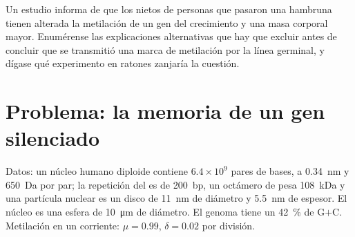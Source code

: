 \begin{exercise}[$\star\star\star$]\label{exo:b3:chromatin-epigenetics:12}
Un estudio informa de que los nietos de personas que pasaron una hambruna
tienen alterada la metilación de un gen del crecimiento y una masa
corporal mayor. Enumérense las explicaciones alternativas que hay que
excluir antes de concluir que se transmitió una marca de metilación por
la línea germinal, y dígase qué experimento en ratones zanjaría la
cuestión.
\end{exercise}

\section{Problema: la memoria de un gen silenciado}

\begin{problem}
\label{pb:b3:chromatin-epigenetics:1}
Datos: un núcleo humano diploide contiene $6.4\times 10^{9}$ pares de
bases, a \qty{0.34}{nm} y \qty{650}{Da} por par; la repetición del
 es de \qty{200}{bp}, un octámero de  pesa
\qty{108}{kDa} y una partícula nuclear es un disco de \qty{11}{nm} de
diámetro y \qty{5.5}{nm} de espesor. El núcleo es una esfera de
\qty{10}{\micro m} de diámetro. El genoma tiene un \qty{42}{\%} de
G$+$C. Metilación en un  corriente: $\mu = 0.99$, $\delta = 0.02$ por
división.


\end{problem}
